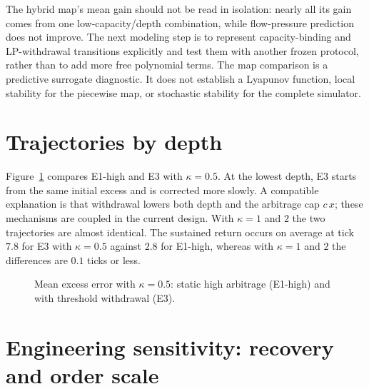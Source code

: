 The hybrid map’s mean gain should not be read in isolation: nearly all its gain comes from one low-capacity/depth combination, while flow-pressure prediction does not improve. The next modeling step is to represent capacity-binding and LP-withdrawal transitions explicitly and test them with another frozen protocol, rather than to add more free polynomial terms. The map comparison is a predictive surrogate diagnostic. It does not establish a Lyapunov function, local stability for the piecewise map, or stochastic stability for the complete simulator.

\section{Trajectories by depth}

Figure~\ref{fig:prof} compares E1-high and E3 with $\kappa=0.5$. At the lowest depth, E3 starts from the same initial excess and is corrected more slowly. A compatible explanation is that withdrawal lowers both depth and the arbitrage cap $c\,x$; these mechanisms are coupled in the current design. With $\kappa=1$ and $2$ the two trajectories are almost identical. The sustained return occurs on average at tick $7.8$ for E3 with $\kappa=0.5$ against $2.8$ for E1-high, whereas with $\kappa=1$ and $2$ the differences are $0.1$ ticks or less.

\begin{figure}[htbp]
\centering
{}
\caption{Mean excess error with $\kappa=0.5$: static high arbitrage (E1-high) and with threshold withdrawal (E3).}
\label{fig:prof}
\end{figure}

\section{Engineering sensitivity: recovery and order scale}
\label{sec:engineering-sensitivity}

